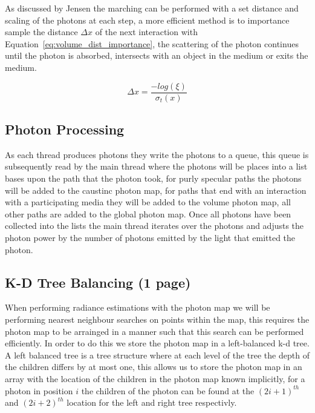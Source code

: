 As discussed by Jensen \cite{JensenBook} the marching can be performed with a set distance and scaling of the photons at each
step, a more efficient method is to importance sample the distance $\Delta x$ of the next interaction with 
Equation~\ref{eq:volume_dist_importance}, the scattering of the photon continues until the photon is absorbed, intersects
with an object in the medium or exits the medium.

\begin{equation}
\Delta x = \frac{-log(\xi)}{\sigma_t(x)}
\label{eq:volum_dist_importance}
\end{equation}

\subsection{Photon Processing}
As each thread produces photons they write the photons to a queue, this queue is subsequently read by the main thread where
the photons will be places into a list bases upon the path that the photon took, for purly specular paths the photons
will be added to the caustinc photon map, for paths that end with an interaction with a participating media they will be
added to the volume photon map, all other paths are added to the global photon map. Once all photons have been collected
into the lists the main thread iterates over the photons and adjusts the photon power by the number of photons emitted by
the light that emitted the photon. 

\subsection{K-D Tree Balancing (1 page)}
When performing radiance estimations with the photon map we will be performing nearest neighbour searches on points within
the map, this requires the photon map to be arrainged in a manner such that this search can be performed efficiently.
In order to do this we store the photon map in a left-balanced k-d tree. A left balanced tree is a tree structure where
at each level of the tree the depth of the children differs by at most one, 
this allows us to store the photon map in an array with the location of the children in the photon map known implicitly,
for a photon in position $i$ the children of the photon can be found at the $(2i + 1)^{th}$ and $(2i + 2)^{th}$
location for the left and right tree respectivly.

